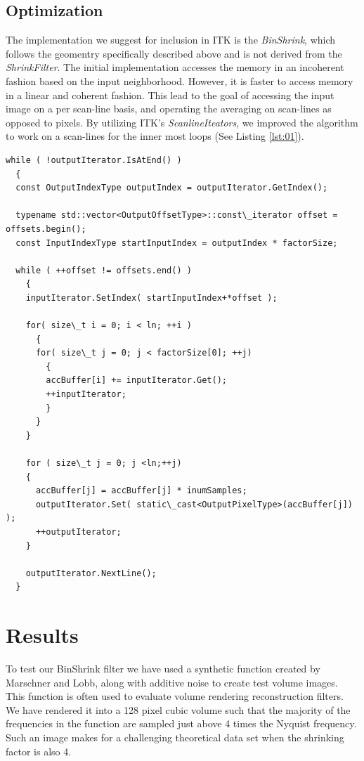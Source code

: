 \documentclass{InsightArticle}
\begin{document}
\subsection{Optimization}

The implementation we suggest for inclusion in ITK is the
\textit{BinShrink}, which follows the geomentry specifically described
above and is not derived from the \textit{ShrinkFilter}. The initial
implementation accesses the memory in an incoherent fashion based on
the input neighborhood. However, it is faster to access memory in a
linear and coherent fashion. This lead to the goal of accessing the
input image on a per scan-line basis, and operating the
averaging on scan-lines as opposed to pixels. By utilizing ITK's
\textit{ScanlineIteators}, we improved the algorithm to work on a
scan-lines for the inner most loops (See Listing \ref{lst:01}).

\begin{lstlisting}[label=lst:02, caption={A selection of code from the
  \textit{BinShrink} filter demonstrating scan-line averaging.}]
while ( !outputIterator.IsAtEnd() )
  {
  const OutputIndexType outputIndex = outputIterator.GetIndex();

  typename std::vector<OutputOffsetType>::const\_iterator offset = offsets.begin();
  const InputIndexType startInputIndex = outputIndex * factorSize;

  while ( ++offset != offsets.end() )
    {
    inputIterator.SetIndex( startInputIndex+*offset );

    for( size\_t i = 0; i < ln; ++i )
      {
      for( size\_t j = 0; j < factorSize[0]; ++j)
        {
        accBuffer[i] += inputIterator.Get();
        ++inputIterator;
        }
      }
    }

    for ( size\_t j = 0; j <ln;++j)
    {
      accBuffer[j] = accBuffer[j] * inumSamples;
      outputIterator.Set( static\_cast<OutputPixelType>(accBuffer[j]) );
      ++outputIterator;
    }

    outputIterator.NextLine();
  }
\end{lstlisting}

\section{Results}

To test our BinShrink filter we have used a synthetic function
created by Marschner and Lobb\cite{MarschnerL94}, along with additive
noise to create test volume images. This function is often used to
evaluate volume rendering reconstruction filters. We have rendered it
into a 128 pixel cubic volume such that the majority of the frequencies in
the function are sampled just above 4 times the Nyquist frequency. Such an image
makes for a challenging theoretical data set when the shrinking factor is also
4.
\end{document}
